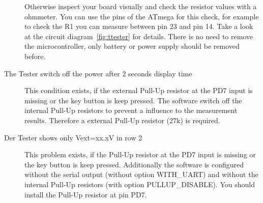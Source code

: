 \begin{description}
Otherwise inspect your board visually and check the resistor values
with a ohmmeter. You can use the pins of the ATmega for this check, for example
to check the R1 you can measure between pin 23 and pin 14. Take a look at the
circuit diagram~\ref{fig:ttester} for details. There is no need to
remove the microcontroller, only battery or power supply should be removed before.

\item[The Tester switch off the power after 2 seconds display time] 
This condition exists, if the external Pull-Up resistor at the PD7 input
is missing or the key button is keep pressed.
The software switch off the internal Pull-Up resistors to prevent a influence
to the measurement results. Therefore a external Pull-Up resistor (27k) is required.

\item[Der Tester shows only Vext=xx.xV in row 2]
This problem exists, if the Pull-Up resistor at the PD7 input
is missing or the key button is keep pressed.
Additionally the software is configured without the serial output (without option WITH\_UART) and
without the internal Pull-Up resistors (with option PULLUP\_DISABLE).
You should install the Pull-Up resistor at pin PD7.


\end{description}
